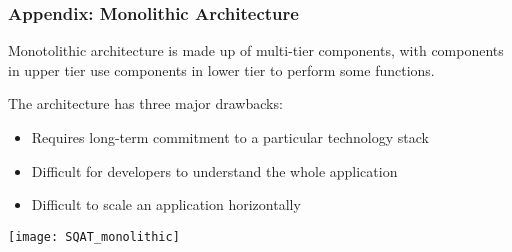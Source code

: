 \begin{frame}[allowframebreaks]
\label{appendix:monolithic}
\frametitle{Appendix: Monolithic Architecture}

\begin{definition}
Monotolithic architecture is made up of multi-tier components, with components in upper tier use components in lower tier to perform some functions.
\end{definition}

The architecture has three major drawbacks:
\begin{itemize}
  \item Requires long-term commitment to a particular technology stack
  \item Difficult for developers to understand the whole application
  \item Difficult to scale an application horizontally
\end{itemize}

\hyperlink{subsection:overall_architecture}{}

\framebreak

\begin{center}
\texttt{[image: SQAT\_monolithic]}
\end{center}

\end{frame}